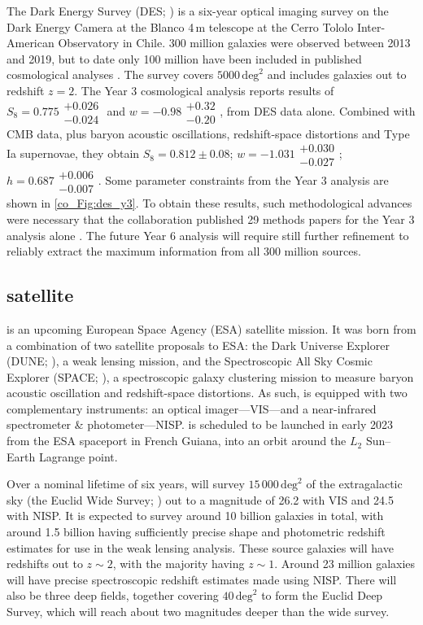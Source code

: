 The Dark Energy Survey (DES; \citealt{DES2005}) is a six-year optical imaging survey on the Dark Energy Camera \citep{Flaugher2015} at the Blanco 4\,m telescope at the Cerro Tololo Inter-American Observatory in Chile. 300 million galaxies were observed between 2013 and 2019, but to date only 100 million have been included in published cosmological analyses \citep{DES2021}. The survey covers $5000\,\text{deg}^2$ and includes galaxies out to redshift $z = 2$. The Year 3 cosmological analysis reports results of $S_8 = 0.775\substack{+0.026\\-0.024}$ and $w = -0.98\substack{+0.32\\-0.20}$, from DES data alone. Combined with \Planck{} CMB data, plus baryon acoustic oscillations, redshift-space distortions and Type Ia supernovae, they obtain $S_8 = 0.812 \pm 0.08$; $w = -1.031\substack{+0.030\\-0.027}$; $h = 0.687\substack{+0.006\\-0.007}$. Some parameter constraints from the Year 3 analysis are shown in \autoref{co_Fig:des_y3}. To obtain these results, such methodological advances were necessary that the collaboration published 29 methods papers for the Year 3 analysis alone \citep[and references therein]{DES2021}. The future Year 6 analysis will require still further refinement to reliably extract the maximum information from all 300 million sources.

\subsection{\Euclid{} satellite}
\label{co_Sec:Euclid}

\Euclid{} \citep{Laureijs2011} is an upcoming European Space Agency (ESA) satellite mission. It was born from a combination of two satellite proposals to ESA: the Dark Universe Explorer (DUNE; \citealt{Refregier2009}), a weak lensing mission, and the Spectroscopic All Sky Cosmic Explorer (SPACE; \citealt{Cimatti2009}), a spectroscopic galaxy clustering mission to measure baryon acoustic oscillation and redshift-space distortions. As such, \Euclid{} is equipped with two complementary instruments: an optical imager---VIS---and a near-infrared spectrometer \& photometer---NISP. \Euclid{} is scheduled to be launched in early 2023 from the ESA spaceport in French Guiana, into an orbit around the $L_2$ Sun--Earth Lagrange point.

Over a nominal lifetime of six years, \Euclid{} will survey $15\,000\,\text{deg}^2$ of the extragalactic sky (the Euclid Wide Survey; \citealt{Scaramella2021}) out to a magnitude of 26.2 with VIS and 24.5 with NISP.
It is expected to survey around 10 billion galaxies in total, with around 1.5 billion having sufficiently precise shape and photometric redshift estimates for use in the weak lensing analysis. These source galaxies will have redshifts out to $z \sim 2$, with the majority having $z \sim 1$. Around 23 million galaxies will have precise spectroscopic redshift estimates made using NISP. There will also be three deep fields, together covering $40\,\text{deg}^2$ to form the Euclid Deep Survey, which will reach about two magnitudes deeper than the wide survey.

